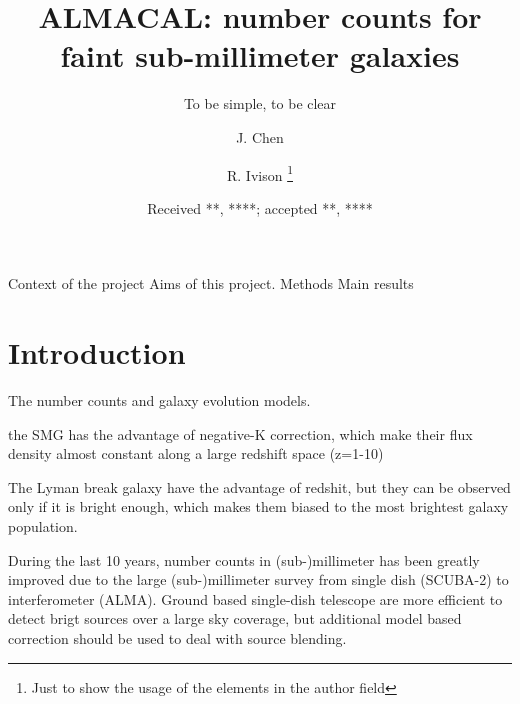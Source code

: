 \documentclass{ref/aa}
\begin{document}
 


   \title{ALMACAL: number counts for faint sub-millimeter galaxies}

   \subtitle{To be simple, to be clear}

   \author{J. Chen
          \and
          R. Ivison \fnmsep\thanks{Just to show the usage
          of the elements in the author field}
          }


   \date{Received **, ****; accepted **, ****}

 
  \abstract
   {Context of the project}
   {Aims of this project.}
   {Methods}
   {Main results}
   {}


   \maketitle
%

\section{Introduction}
The number counts and galaxy evolution models.

the SMG has the advantage of negative-K correction, which make their flux density almost constant along a large redshift space (z=1-10)

The Lyman break galaxy have the advantage of redshit, but they can be observed only if it is bright enough, which makes them biased to the most brightest galaxy population.

During the last 10 years, number counts in (sub-)millimeter has been greatly improved due to the large (sub-)millimeter survey from single dish (SCUBA-2) to interferometer (ALMA). Ground based single-dish telescope are more efficient to detect brigt sources over a large sky coverage, but additional model based correction should be used to deal with source blending.
\end{document}

